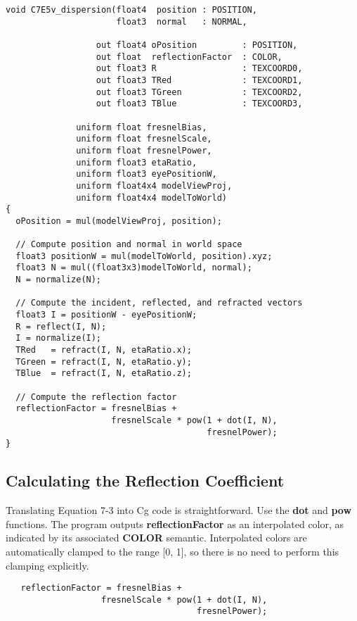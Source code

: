 \documentclass[../main.tex]{subfiles}
\begin{document}
\FloatBarrier
\begin{lstlisting}[caption=Example 7-5. The \textbf{C7E5v_dispersion} Vertex Program]
void C7E5v_dispersion(float4  position : POSITION,
                      float3  normal   : NORMAL,

                  out float4 oPosition         : POSITION,
                  out float  reflectionFactor  : COLOR,
                  out float3 R                 : TEXCOORD0,
                  out float3 TRed              : TEXCOORD1,
                  out float3 TGreen            : TEXCOORD2,
                  out float3 TBlue             : TEXCOORD3,

              uniform float fresnelBias,
              uniform float fresnelScale,
              uniform float fresnelPower,
              uniform float3 etaRatio,
              uniform float3 eyePositionW,
              uniform float4x4 modelViewProj,
              uniform float4x4 modelToWorld)
{
  oPosition = mul(modelViewProj, position);

  // Compute position and normal in world space
  float3 positionW = mul(modelToWorld, position).xyz;
  float3 N = mul((float3x3)modelToWorld, normal);
  N = normalize(N);

  // Compute the incident, reflected, and refracted vectors
  float3 I = positionW - eyePositionW;
  R = reflect(I, N);
  I = normalize(I);
  TRed   = refract(I, N, etaRatio.x);
  TGreen = refract(I, N, etaRatio.y);
  TBlue  = refract(I, N, etaRatio.z);

  // Compute the reflection factor
  reflectionFactor = fresnelBias +
                     fresnelScale * pow(1 + dot(I, N),
                                        fresnelPower);
}
\end{lstlisting}
\FloatBarrier

\subsection*{Calculating the Reflection Coefficient}

Translating Equation 7-3 into Cg code is straightforward. Use the \textbf{dot} and \textbf{pow} functions. The program outputs \textbf{reflectionFactor} as an interpolated color, as indicated by its associated \textbf{COLOR} semantic. Interpolated colors are automatically clamped to the range [0, 1], so there is no need to perform this clamping explicitly.

\FloatBarrier
\begin{lstlisting}
   reflectionFactor = fresnelBias +
                   fresnelScale * pow(1 + dot(I, N),
                                      fresnelPower);
\end{lstlisting}
\FloatBarrier
\end{document}
